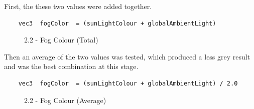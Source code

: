 \documentclass[a4 paper, 12pt]{article}
\begin{document}
First, the these two values were added together.
\begin{lstlisting}
    vec3  fogColor  = (sunLightColour + globalAmbientLight)
\end{lstlisting} 

\begin{figure} [H]
    \caption{2.2 - Fog Colour (Total)}   
\end{figure}

Then an average of the two values was tested, which produced a less grey result and was the best combination at this stage.
\begin{lstlisting}
    vec3  fogColor  = (sunLightColour + globalAmbientLight) / 2.0
\end{lstlisting}

\begin{figure} [H]
    \caption{2.2 - Fog Colour (Average)}   
\end{figure}
\end{document}
